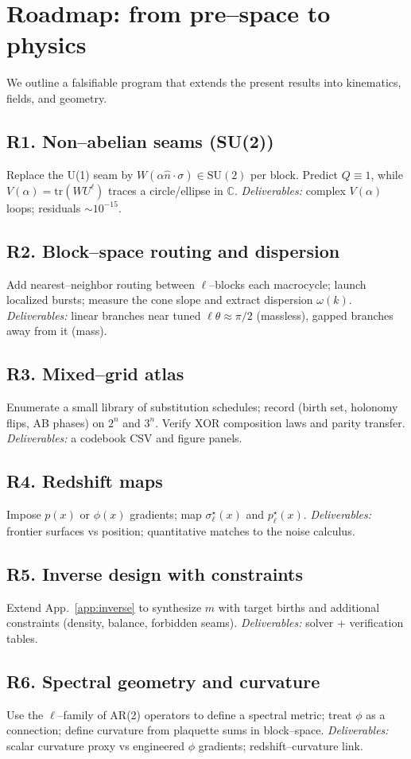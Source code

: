 \documentclass[11pt]{article}
\begin{document}
\section{Roadmap: from pre--space to physics}
We outline a falsifiable program that extends the present results into kinematics, fields, and geometry.
\subsection*{R1. Non--abelian seams (SU(2))}
Replace the U(1) seam by $W(\alpha\hat n\cdot\sigma)\in \mathrm{SU}(2)$ per block. Predict $Q\equiv 1$, while $V(\alpha)=\mathrm{tr}(W U^\ell)$ traces a circle/ellipse in $\mathbb{C}$. \emph{Deliverables:} complex $V(\alpha)$ loops; residuals $\sim 10^{-15}$.
\subsection*{R2. Block--space routing and dispersion}
Add nearest--neighbor routing between $\ell$--blocks each macrocycle; launch localized bursts; measure the cone slope and extract dispersion $\omega(k)$. \emph{Deliverables:} linear branches near tuned $\ell\theta\approx \pi/2$ (massless), gapped branches away from it (mass).
\subsection*{R3. Mixed--grid atlas}
Enumerate a small library of substitution schedules; record (birth set, holonomy flips, AB phases) on $2^n$ and $3^n$. Verify XOR composition laws and parity transfer. \emph{Deliverables:} a codebook CSV and figure panels.
\subsection*{R4. Redshift maps}
Impose $p(x)$ or $\phi(x)$ gradients; map $\sigma_\ell^\star(x)$ and $p_\ell^\star(x)$. \emph{Deliverables:} frontier surfaces vs position; quantitative matches to the noise calculus.
\subsection*{R5. Inverse design with constraints}
Extend App.~\ref{app:inverse} to synthesize $m$ with target births and additional constraints (density, balance, forbidden seams). \emph{Deliverables:} solver + verification tables.
\subsection*{R6. Spectral geometry and curvature}
Use the $\ell$--family of AR(2) operators to define a spectral metric; treat $\phi$ as a connection; define curvature from plaquette sums in block--space. \emph{Deliverables:} scalar curvature proxy vs engineered $\phi$ gradients; redshift--curvature link.
\end{document}
